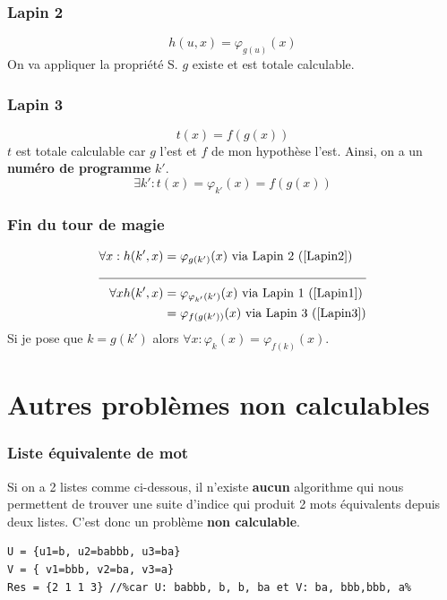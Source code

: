 \documentclass{report}
\begin{document}
\subsubsection{Lapin 2}
\begin{equation}
h(u,x) = \varphi_{g(u)} (x)
\label{Lapin2}
\end{equation}
On va appliquer la propriété S. $g$ existe et est totale calculable.

\subsubsection{Lapin 3}
\begin{equation}
t(x) = f(g(x))
\end{equation}
$t$ est totale calculable car $g$ l'est et $f$ de mon hypothèse l'est. Ainsi, on a un \textbf{numéro de programme} $k'$.
\begin{equation}
\exists k' : t(x) = \varphi_{k'}(x) = f(g(x))
\label{Lapin3}
\end{equation} 

\subsubsection{Fin du tour de magie}
\begin{align*}
\forall x : h(k',x) &= \varphi_{g(k')} (x) \text{ via Lapin 2 (\ref{Lapin2})}\\
\cline{1-2}
\forall x h(k', x) &= \varphi_{\varphi_{k'} (k')} (x) \text{ via Lapin 1 (\ref{Lapin1})}\\
&= \varphi_{f(g(k'))} (x) \text{ via Lapin 3  (\ref{Lapin3})}
\end{align*}
Si je pose que $k = g(k')$ alors $\forall x : \varphi_k (x) =  \varphi_{f(k)} (x)$.

\section{Autres problèmes non calculables}
\subsubsection{Liste équivalente de mot}
Si on a 2 listes comme ci-dessous, il n'existe \textbf{aucun} algorithme qui nous permettent de trouver une suite d'indice qui produit 2 mots équivalents depuis deux listes. C'est donc un problème \textbf{non calculable}.
\begin{lstlisting}[escapechar=\%]
%$\Sigma$% = {a,b} 
U = {u1=b, u2=babbb, u3=ba}
V = { v1=bbb, v2=ba, v3=a}
Res = {2 1 1 3} //%car U: babbb, b, b, ba et V: ba, bbb,bbb, a%
\end{lstlisting}
\end{document}
